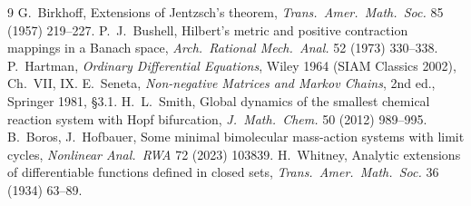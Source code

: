 \documentclass[11pt,a4paper]{article}
\numberwithin{equation}{section}
\theoremstyle{remark}\newtheorem{remark}[theorem]{Remark}
\begin{document}
\begin{thebibliography}{9}
 G.~Birkhoff, Extensions of Jentzsch's theorem, \emph{Trans.\ Amer.\ Math.\ Soc.} 85 (1957) 219--227.
 P.~J.~Bushell, Hilbert's metric and positive contraction mappings in a Banach space, \emph{Arch.\
Rational Mech.\ Anal.} 52 (1973) 330--338.
 P.~Hartman, \emph{Ordinary Differential Equations}, Wiley 1964 (SIAM Classics 2002), Ch.~VII, IX.
\bibitem{S} E.~Seneta, \emph{Non-negative Matrices and Markov Chains}, 2nd ed., Springer 1981, \S3.1.
\bibitem{Sm} H.~L.~Smith, Global dynamics of the smallest chemical reaction system with Hopf bifurcation,
\emph{J.\ Math.\ Chem.} 50 (2012) 989--995.
 B.~Boros, J.~Hofbauer, Some minimal bimolecular mass-action systems with limit cycles,
\emph{Nonlinear Anal.\ RWA} 72 (2023) 103839.
 H.~Whitney, Analytic extensions of differentiable functions defined in closed sets, \emph{Trans.\ Amer.\
Math.\ Soc.} 36 (1934) 63--89.
\end{thebibliography}
\end{document}
